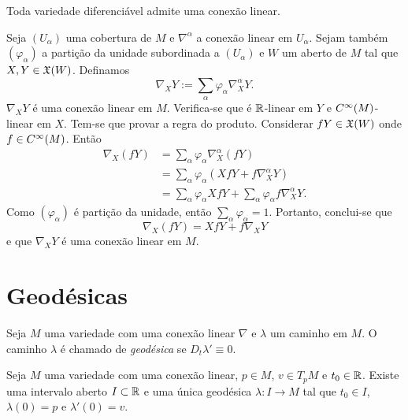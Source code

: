 \begin{proposicao}
	Toda variedade diferenciável admite uma conexão linear.
\end{proposicao}

\begin{demonstracao}
	Seja $(U_{\alpha})$ uma cobertura de $M$ e $\nabla^{\alpha}$ a conexão linear em $U_{\alpha}$. Sejam também $(\varphi_{\alpha})$ a partição da unidade subordinada a $(U_{\alpha})$ e $W$ um aberto de $M$ tal que $X,Y \in \mathfrak{X}(W)$. Definamos
	\begin{equation*}
		\nabla_X Y := \sum_{\alpha} \varphi_{\alpha} \nabla_X^{\alpha} Y.
	\end{equation*}
	$\nabla_X Y$ é uma conexão linear em $M$. Verifica-se que é $\mathbb{R}$-linear em $Y$ e $C^\infty(M)$-linear em $X$. Tem-se que provar a regra do produto. Considerar $fY \in \mathfrak{X}(W)$ onde $f \in C^\infty(M)$. Então
	\begin{align*}
		\nabla_X (fY) &= \sum_{\alpha} \varphi_{\alpha} \nabla_X^{\alpha} (fY)\\
		&= \sum_{\alpha} \varphi_{\alpha} (Xf Y + f \nabla_X^{\alpha} Y)\\
		&= \sum_{\alpha} \varphi_{\alpha} X f Y + \sum_{\alpha} \varphi_{\alpha} f \nabla_X^{\alpha} Y. 
	\end{align*}
	Como $(\varphi_{\alpha})$ é partição da unidade, então $\sum_{\alpha} \varphi_{\alpha} = 1$. Portanto, conclui-se que
	\begin{equation*}
		\nabla_X (fY) = X f Y + f \nabla_X Y
	\end{equation*}
	e que $\nabla_X Y$ é uma conexão linear em $M$.
\end{demonstracao}

\section{Geodésicas}

\begin{definicao}
	Seja $M$ uma variedade com uma conexão linear $\nabla$ e
	$\lambda$ um caminho em $M$.
	O caminho $\lambda$ é chamado de \emph{geodésica} se $D_t \lambda' \equiv 0$.
\end{definicao}

\begin{teorema}
	Seja $M$ uma variedade com uma conexão linear,
	$p \in M$,
	$v \in T_p M$ e
	$t_0 \in \mathbb R$.
	Existe uma intervalo aberto $I \subset \mathbb R$ e uma única geodésica $\lambda: I \rightarrow M$ tal que $t_0 \in I$,
	$\lambda(0) = p$ e
	$\lambda'(0) = v$.
\end{teorema}

